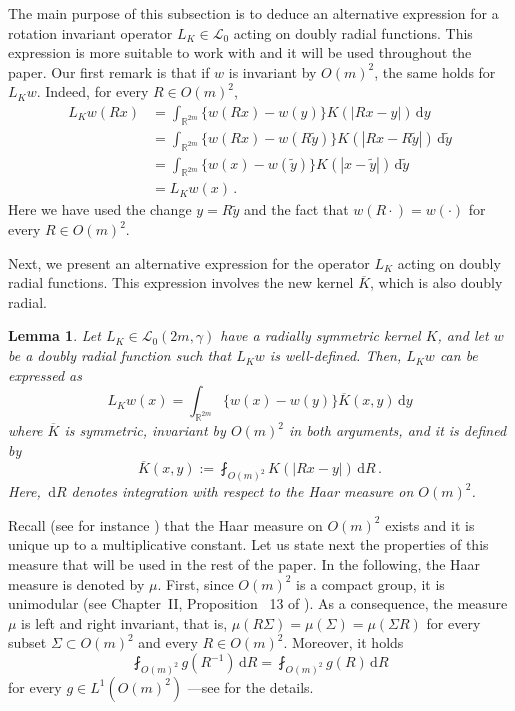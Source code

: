 \documentclass[12pt,reqno]{amsart}
\newtheorem{lemma}[theorem]{Lemma}
\theoremstyle{definition}
\theoremstyle{remark}
\newcommand{\con}[1]{\mathbb{#1}}
\newcommand{\R}{\con{R}} %
\newcommand{\lcal}{\mathcal{L}}
\newcommand{\s}{\gamma}
\renewcommand{\d}{\,\mathrm{d}} %
\newcommand{\average}{\fint}
\numberwithin{equation}{section}
\begin{document}
The main purpose of this subsection is to deduce an alternative expression for a rotation invariant operator $L_K \in \lcal_0$ acting on doubly radial functions. This expression is more suitable to work with and it will be used throughout the paper. Our first remark is that if $w$ is invariant by $O(m)^2$, the same holds for $L_Kw$. Indeed, for every $R \in O(m)^2$,
\begin{align*}
L_K w (Rx)
& = \int_{\R^{2m}} \{w(Rx) - w(y)\} K(|Rx - y|)  \d y\\
& = \int_{\R^{2m}} \{w(Rx) - w(R\tilde{y})\} K(|Rx - R\tilde{y}|) \d \tilde{y}\\
& = \int_{\R^{2m}} \{w(x) - w(\tilde{y})\} K(|x-\tilde{y}|) \d \tilde{y}\\
& = L_K w (x)\,.
\end{align*}
Here we have used the change $y = R\tilde{y}$ and the fact that $w(R \cdot) = w(\cdot)$ for every $R\in O(m)^2$.

Next, we present an alternative expression for the operator $L_K $ acting on doubly radial functions. This expression involves the new kernel $\overline{K}$, which is also doubly radial.

\begin{lemma} \label{Lemma:AlternativeOperatorExpression}
	Let $L_K \in \lcal_0(2m,\s)$ have a radially symmetric kernel $K$, and let $w$ be a doubly radial function such that $L_K w$ is well-defined. Then, $L_K w$ can be expressed as
	$$
	L_K w(x) = \int_{\R^{2m}} \{w(x) - w(y)\} \overline{K}(x,y) \d y
	$$
	where $\overline{K}$ is symmetric, invariant by $O(m)^2$ in both arguments, and it is defined by
	\begin{equation*}
	\overline{K}(x,y) := \average_{O(m)^2} K(|Rx - y|)\d R\,.
	\end{equation*}
	Here, $\d R$ denotes integration with respect to the Haar measure on $O(m)^2$.
\end{lemma}

Recall (see for instance \cite{Nachbin}) that the Haar measure on $O(m)^2$ exists and it is unique up to a
multiplicative constant. Let us state next the properties of this measure that will be used in the rest of the
paper. In the following, the Haar measure is denoted by $\mu$. First, since $O(m)^2$ is a compact
group, it is unimodular (see Chapter~II, Proposition~ 13 of \cite{Nachbin}). As a consequence, the
measure $\mu$ is left and right invariant, that is, $\mu(R\Sigma) = \mu(\Sigma) = \mu(\Sigma R) $
for every subset $\Sigma \subset O(m)^2$ and every $R\in O(m)^2$. Moreover, it holds
\begin{equation}
\label{Eq:Unimodular}
\average_{O(m)^2} g(R^{-1}) \d R = \average_{O(m)^2} g(R) \d R
\end{equation}	
for every $g\in L^1(O(m)^2)$ ---see \cite{Nachbin} for the details.
\end{document}
